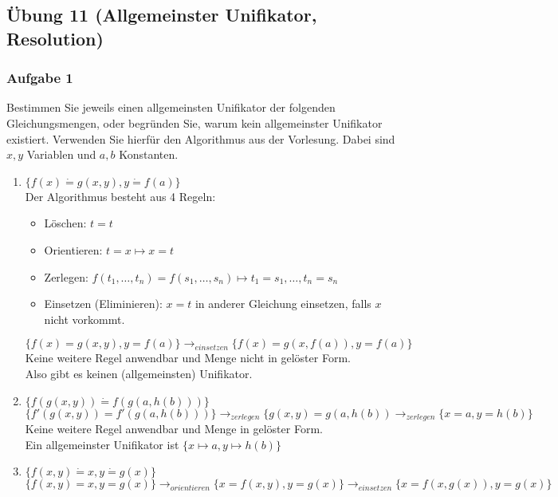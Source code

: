 \subsection*{Übung 11 (Allgemeinster Unifikator, Resolution)}
\subsubsection*{Aufgabe 1}
Bestimmen Sie jeweils einen allgemeinsten Unifikator der folgenden Gleichungsmengen, oder begründen Sie, warum kein allgemeinster Unifikator existiert. Verwenden Sie hierfür den Algorithmus aus der Vorlesung. Dabei sind $x,y$ Variablen und $a,b$ Konstanten.
\begin{enumerate}
\item $\{ f(x) \dot{=} g(x,y), y \dot{=} f(a) \}$ \\
\LOES Der Algorithmus besteht aus 4 Regeln: 
\begin{itemize}
\item Löschen: $t=t$
\item Orientieren: $t=x \mapsto x=t$
\item Zerlegen: $f(t_1,\dots,t_n) = f(s_1,\dots,s_n) \mapsto t_1=s_1,\dots, t_n=s_n$
\item Einsetzen (Eliminieren): $x=t$ in anderer Gleichung einsetzen, falls $x$ nicht vorkommt.
\end{itemize}
\begin{equation*}
\{ f(x) = g(x,y), y = f(a) \} \rightarrow_{einsetzen} \{ f(x) = g(x,f(a)), y = f(a) \}
\end{equation*}
Keine weitere Regel anwendbar und Menge nicht in gelöster Form. \\
Also gibt es keinen (allgemeinsten) Unifikator.
\item $\{ f(g(x,y)) \dot{=} f(g(a,h(b))) \}$ \\
\LOES 
\begin{equation*}
\{ f'(g(x,y)) = f'(g(a,h(b))) \} \rightarrow_{zerlegen} \{g(x,y) = g(a,h(b)) \rightarrow_{zerlegen} \{x=a, y=h(b)\}
\end{equation*}
Keine weitere Regel anwendbar und Menge in gelöster Form. \\
Ein allgemeinster Unifikator ist $\{x \mapsto a, y \mapsto h(b) \}$
\item $\{ f(x,y) \dot{=} x, y \dot{=} g(x) \}$ \\
\LOES
\begin{equation*}
\{ f(x,y) = x, y = g(x) \} \rightarrow_{orientieren} \{x=f(x,y), y=g(x)\} \rightarrow_{einsetzen} \{x = f(x,g(x)), y= g(x) \}

\end{equation*}
\end{enumerate}
